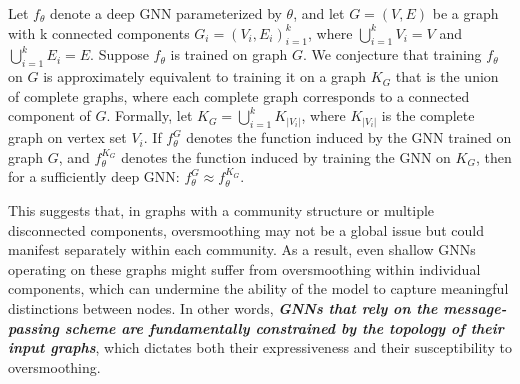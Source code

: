 \begin{theorem}
\label{thm:compo_hop}
Let $f_\theta$ denote a deep GNN parameterized by $\theta$, and let $G = (V, E)$ be a graph with k connected components ${G_i = (V_i, E_i)}_{i=1}^k$, where $\bigcup_{i=1}^k V_i = V$ and $\bigcup_{i=1}^k E_i = E$. Suppose $f_\theta$ is trained on graph $G$. We conjecture that training $f_\theta$ on $G$ is approximately equivalent to training it on a graph $K_G$ that is the union of complete graphs, where each complete graph corresponds to a connected component of $G$. Formally, let $K_G = \bigcup_{i=1}^k K_{|V_i|}$, where $K_{|V_i|}$ is the complete graph on vertex set $V_i$. If $f_\theta^G$ denotes the function induced by the GNN trained on graph $G$, and $f_\theta^{K_G}$ denotes the function induced by training the GNN on $K_G$, then for a sufficiently deep GNN: $f_\theta^G \approx f_\theta^{K_G}$.
\end{theorem}

This suggests that, in graphs with a community structure or multiple disconnected components, oversmoothing may not be a global issue but could manifest separately within each community. As a result, even shallow GNNs operating on these graphs might suffer from oversmoothing within individual components, which can undermine the ability of the model to capture meaningful distinctions between nodes. In other words, \textbf{\textit{GNNs that rely on the message-passing scheme are fundamentally constrained by the topology of their input graphs}}, which dictates both their expressiveness and their susceptibility to oversmoothing.